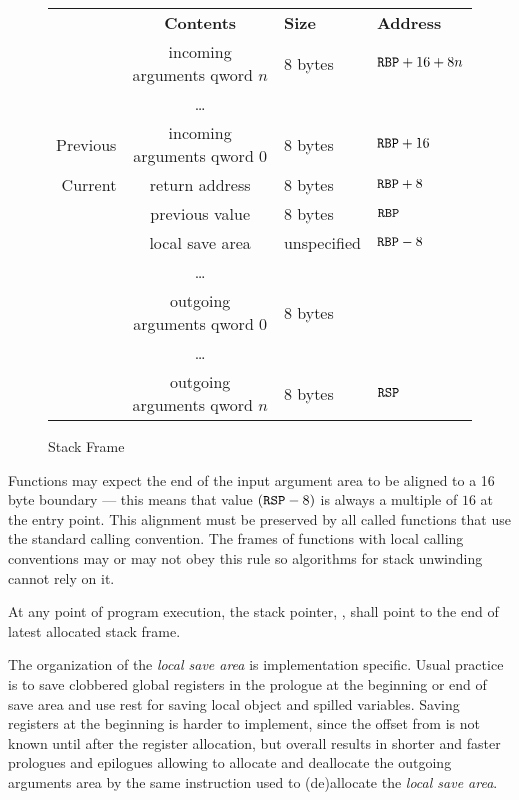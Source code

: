 \begin{figure}
  \caption{Stack Frame}
  \label{fig-stack-frame}
  \begin{center}
    \begin{tabular}{r|cl|l}
      \noalign{\smallskip}
      \multicolumn{1}{l}{\bf Frame} &
      \multicolumn{1}{c}{\bf Contents} &
      \multicolumn{1}{l}{\bf Size} &
      \multicolumn{1}{l}{\bf Address} \\
      \noalign{\smallskip}  \cline{2-3}
      & incoming arguments qword $n$ & 8 bytes & ${\texttt{RBP}}+16+8n$ \\
      & \dots & & \\
      Previous& incoming arguments qword $0$ & 8 bytes & ${\texttt{RBP}}+16$ \\ \cline{1-4} 
      Current & return address & 8 bytes & ${\texttt{RBP}}+8$\\ \cline{2-3}
      & previous \RBP{} value & 8 bytes & ${\texttt{RBP}}$ \\ \cline{2-3}
      & local save area & unspecified & ${\texttt{RBP}}-8$\\ 
      & \dots & & \\ \cline {2-3}
      & outgoing arguments qword $0$ & 8 bytes &\\
      & \dots & & \\
      & outgoing arguments qword $n$ & 8 bytes & ${\texttt{RSP}}$ \\ \cline{2-3}
    \end{tabular}
  \end{center}
\end{figure}


Functions may expect the end of the input argument area to be aligned
to a 16 byte boundary --- this means that value $({\texttt{RSP}} - 8)$ is always a
multiple of $16$ at the entry point. This alignment must be preserved by
all called functions that use the standard calling convention. The
frames of functions with local calling conventions may or may not obey
this rule so algorithms for stack unwinding cannot rely on it.

At any point of program execution, the stack pointer, \RSP, shall point to
the end of  latest allocated stack frame.

The organization of the \emph{local save area} is implementation
specific. Usual practice is to save clobbered global registers in the
prologue at the beginning or end of save area and use rest for saving
local object and spilled variables.  Saving registers at the beginning
is harder to implement, since the offset from \RBP{} is not known
until after the register allocation, but overall results in shorter
and faster prologues and epilogues allowing to allocate and deallocate
the outgoing arguments area by the same instruction used to
(de)allocate the \emph{local save area}.

